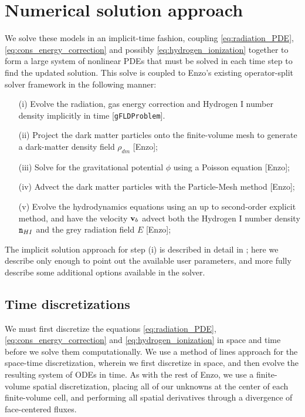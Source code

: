 \documentclass[letterpaper,10pt]{article}
\renewcommand{\(}{\left(}
\renewcommand{\)}{\right)}
\newcommand{\vb}{{\bf v}_b}
\newcommand{\mn}{{\tt n}}
\begin{document}
\section{Numerical solution approach}
\label{sec:solution_approach}

We solve these models in an implicit-time fashion, coupling 
\eqref{eq:radiation_PDE}, \eqref{eq:cons_energy_correction} and
possibly \eqref{eq:hydrogen_ionization} together to form a large
system of nonlinear PDEs that must be solved in each time step to find
the updated solution.  This solve is coupled to Enzo's existing
operator-split solver framework in the following manner:
\begin{itemize}
\item[(i)] Evolve the radiation, gas energy correction and Hydrogen I
  number density implicitly in time [{\tt gFLDProblem}].
\item[(ii)] Project the dark matter particles onto the finite-volume
  mesh to generate a dark-matter density field $\rho_{dm}$ [Enzo];
\item[(iii)] Solve for the gravitational potential $\phi$ using a
  Poisson equation [Enzo];
\item[(iv)] Advect the dark matter particles with the Particle-Mesh
  method [Enzo];
\item[(v)] Evolve the hydrodynamics equations using an up to
  second-order explicit method, and have the velocity $\vb$ advect
  both the Hydrogen I number density $\mn_{HI}$ and the grey radiation
  field $E$ [Enzo]; 
\end{itemize}

The implicit solution approach for step (i) is described in detail in 
\cite{ReynoldsHayesPaschosNorman2009}; here we describe only enough
to point out the available user parameters, and more fully describe
some additional options available in the solver.

\subsection{Time discretizations}
\label{sec:iqss}

We must first discretize the equations \eqref{eq:radiation_PDE},
\eqref{eq:cons_energy_correction} and \eqref{eq:hydrogen_ionization}
in space and time before we solve them computationally.  We use a
method of lines approach for the space-time discretization, wherein we
first discretize in space, and then evolve the resulting system of
ODEs in time.  As with the rest of Enzo, we use a finite-volume
spatial discretization, placing all of our unknowns at the center of
each finite-volume cell, and performing all spatial derivatives
through a divergence of face-centered fluxes.  
\end{document}
